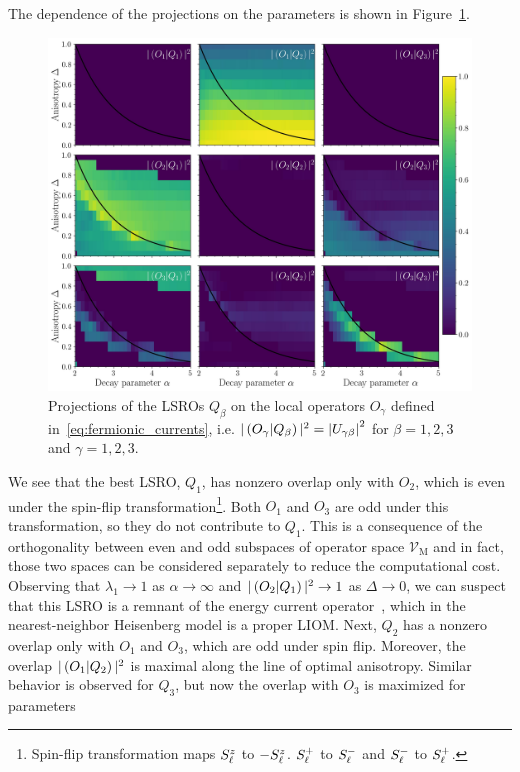 The dependence of the projections on the parameters is shown in Figure~\ref{fig:projections}.
\begin{figure}[h]
  \centering
  \includegraphics[width=0.85\linewidth]{Figures/projections.jpg}
  \caption{Projections of the LSROs \(Q_{\beta}\) on the local operators \(O_{\gamma}\) defined in~\eqref{eq:fermionic_currents},
    i.e. \(\vert\left(O_{\gamma} \middle| Q_{\beta}\right)\vert^2 = \abs{U_{\gamma\beta}}^2\) for \(\beta = 1,2,3\) and \(\gamma = 1,2,3\).}
  \label{fig:projections}
\end{figure}
We see that the best LSRO, \(Q_1\), has nonzero overlap only with \(O_2\), which is even under the
spin-flip transformation\footnote{Spin-flip transformation maps \(S^{z}_{\ell}\) to \(-S^{z}_{\ell}\).
  \(S^{+}_{\ell}\) to \(S^{-}_{\ell}\) and \(S^{-}_{\ell}\) to \(S^{+}_{\ell}\).}.
Both \(O_1\) and \(O_3\) are odd under this transformation, so they do not contribute to \(Q_1\).
This is a consequence of the orthogonality between even and odd subspaces of operator space \(\mathcal{V}_{\textrm{M}}\)
and in fact, those two spaces can be considered separately to reduce the computational cost.
Observing that \(\lambda_1 \to 1\) as \(\alpha \to \infty\) and \(\vert\left(O_2 \middle| Q_1\right)\vert^2 \to 1\) as
\(\Delta\to 0\), we can suspect that this LSRO is a remnant of the energy current operator~\autocite{Zotos1997},
which in the nearest-neighbor Heisenberg model is a proper LIOM.
Next, \(Q_2\) has a nonzero overlap only with \(O_1\) and \(O_3\), which are odd under spin flip.
Moreover, the overlap \(\vert\left(O_1 \middle| Q_2\right)\vert^2\) is maximal along the line of optimal anisotropy.
Similar behavior is observed for \(Q_3\), but now the overlap with \(O_3\) is maximized for parameters
